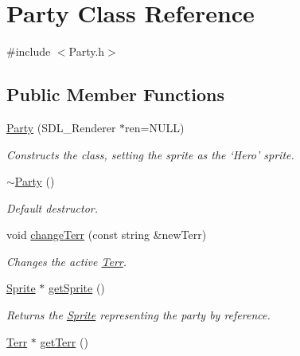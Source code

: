 \hypertarget{class_party}{}\section{Party Class Reference}
\label{class_party}


{\ttfamily \#include $<$Party.\+h$>$}

\subsection*{Public Member Functions}
\begin{DoxyCompactItemize}
\item 
\hyperlink{class_party_a8983e1cea966e90a51e49b88fd4ec29a}{Party} (S\+D\+L\+\_\+\+Renderer $\ast$ren=N\+U\+LL)\hypertarget{class_party_a8983e1cea966e90a51e49b88fd4ec29a}{}\label{class_party_a8983e1cea966e90a51e49b88fd4ec29a}

\begin{DoxyCompactList}\small\item\em Constructs the class, setting the sprite as the ‘\+Hero’ sprite. \end{DoxyCompactList}\item 
\hyperlink{class_party_a85aa837e38a06690e6fee5087d7c7ad7}{$\sim$\+Party} ()\hypertarget{class_party_a85aa837e38a06690e6fee5087d7c7ad7}{}\label{class_party_a85aa837e38a06690e6fee5087d7c7ad7}

\begin{DoxyCompactList}\small\item\em Default destructor. \end{DoxyCompactList}\item 
void \hyperlink{class_party_a5b4e7bc4d910ad64722629b2fe365240}{change\+Terr} (const string \&new\+Terr)\hypertarget{class_party_a5b4e7bc4d910ad64722629b2fe365240}{}\label{class_party_a5b4e7bc4d910ad64722629b2fe365240}

\begin{DoxyCompactList}\small\item\em Changes the active \hyperlink{class_terr}{Terr}. \end{DoxyCompactList}\item 
\hyperlink{class_sprite}{Sprite} $\ast$ \hyperlink{class_party_a79d7e55a83b66a41146679deb3b4c533}{get\+Sprite} ()\hypertarget{class_party_a79d7e55a83b66a41146679deb3b4c533}{}\label{class_party_a79d7e55a83b66a41146679deb3b4c533}

\begin{DoxyCompactList}\small\item\em Returns the \hyperlink{class_sprite}{Sprite} representing the party by reference. \end{DoxyCompactList}\item 
\hyperlink{class_terr}{Terr} $\ast$ \hyperlink{class_party_ae0a1a365f425b46efdf315998465503f}{get\+Terr} ()\hypertarget{class_party_ae0a1a365f425b46efdf315998465503f}{}\label{class_party_ae0a1a365f425b46efdf315998465503f}


\end{DoxyCompactItemize}
